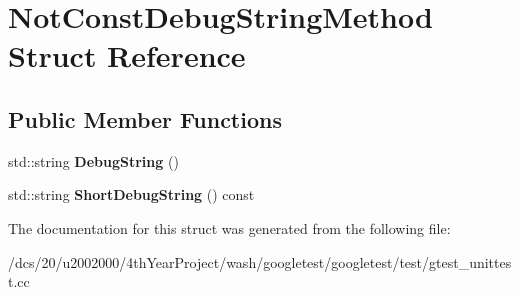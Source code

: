 \hypertarget{structNotConstDebugStringMethod}{}\section{Not\+Const\+Debug\+String\+Method Struct Reference}
\label{structNotConstDebugStringMethod}
\subsection*{Public Member Functions}
\begin{DoxyCompactItemize}
\item 
\mbox{\label{structNotConstDebugStringMethod_a59eb1b92bda6766253eaeace4930513d}} 
std\+::string {\bfseries Debug\+String} ()
\item 
\mbox{\label{structNotConstDebugStringMethod_a5e14180c801480d2286831166f07a563}} 
std\+::string {\bfseries Short\+Debug\+String} () const
\end{DoxyCompactItemize}


The documentation for this struct was generated from the following file\+:\begin{DoxyCompactItemize}
\item 
/dcs/20/u2002000/4th\+Year\+Project/wash/googletest/googletest/test/gtest\+\_\+unittest.\+cc\end{DoxyCompactItemize}
